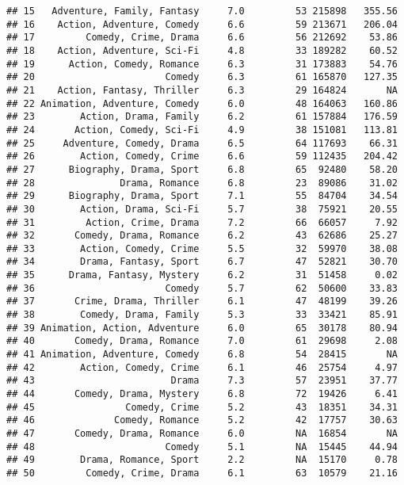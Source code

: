 \documentclass[
]{article}
\newenvironment{Shaded}{\begin{snugshade}}{\end{snugshade}}
\begin{document}
\begin{Shaded}
\begin{Highlighting}[]
\begin{verbatim}
## 15   Adventure, Family, Fantasy     7.0         53 215898   355.56
## 16    Action, Adventure, Comedy     6.6         59 213671   206.04
## 17         Comedy, Crime, Drama     6.6         56 212692    53.86
## 18    Action, Adventure, Sci-Fi     4.8         33 189282    60.52
## 19      Action, Comedy, Romance     6.3         31 173883    54.76
## 20                       Comedy     6.3         61 165870   127.35
## 21    Action, Fantasy, Thriller     6.3         29 164824       NA
## 22 Animation, Adventure, Comedy     6.0         48 164063   160.86
## 23        Action, Drama, Family     6.2         61 157884   176.59
## 24       Action, Comedy, Sci-Fi     4.9         38 151081   113.81
## 25     Adventure, Comedy, Drama     6.5         64 117693    66.31
## 26        Action, Comedy, Crime     6.6         59 112435   204.42
## 27      Biography, Drama, Sport     6.8         65  92480    58.20
## 28               Drama, Romance     6.8         23  89086    31.02
## 29      Biography, Drama, Sport     7.1         55  84704    34.54
## 30        Action, Drama, Sci-Fi     5.7         38  75921    20.55
## 31         Action, Crime, Drama     7.2         66  66057     7.92
## 32       Comedy, Drama, Romance     6.2         43  62686    25.27
## 33        Action, Comedy, Crime     5.5         32  59970    38.08
## 34        Drama, Fantasy, Sport     6.7         47  52821    30.70
## 35      Drama, Fantasy, Mystery     6.2         31  51458     0.02
## 36                       Comedy     5.7         62  50600    33.83
## 37       Crime, Drama, Thriller     6.1         47  48199    39.26
## 38        Comedy, Drama, Family     5.3         33  33421    85.91
## 39 Animation, Action, Adventure     6.0         65  30178    80.94
## 40       Comedy, Drama, Romance     7.0         61  29698     2.08
## 41 Animation, Adventure, Comedy     6.8         54  28415       NA
## 42        Action, Comedy, Crime     6.1         46  25754     4.97
## 43                        Drama     7.3         57  23951    37.77
## 44       Comedy, Drama, Mystery     6.8         72  19426     6.41
## 45                Comedy, Crime     5.2         43  18351    34.31
## 46              Comedy, Romance     5.2         42  17757    30.63
## 47       Comedy, Drama, Romance     6.0         NA  16854       NA
## 48                       Comedy     5.1         NA  15445    44.94
## 49        Drama, Romance, Sport     2.2         NA  15170     0.78
## 50         Comedy, Crime, Drama     6.1         63  10579    21.16
\end{verbatim}


\end{Highlighting}
\end{Shaded}
\end{document}
